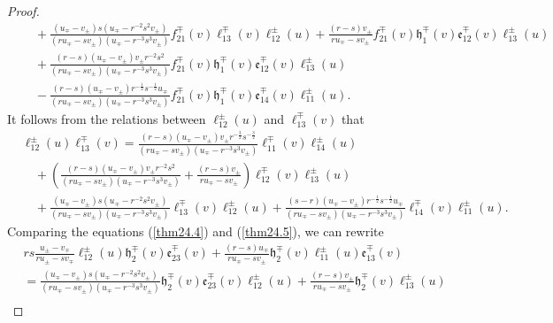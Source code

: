 \documentclass[10pt,a4paper]{amsart}
\numberwithin{equation}{section}
\begin{document}
\begin{proof}
\begin{equation}
\begin{aligned}
&\quad+\frac{\left(u_{\mp}-v_{ \pm}\right) s\left(u_{\mp}-r^{-2} s^2 v_{ \pm}\right)}{\left(r u_{\mp}-s v_{ \pm}\right)\left(u_{\mp}-r^{-3} s^3 v_{ \pm}\right)} f_{21}^{\mp}(v) \ell_{13}^{\mp}(v) \ell_{12}^{ \pm}(u)+\frac{(r-s) v_{ \pm}}{r u_{\mp}-s v_{ \pm}} f_{21}^{\mp}(v) \mathfrak{h}_1^{\mp}(v) \mathfrak{e}_{12}^{\mp}(v) \ell_{13}^{ \pm}(u)\\
&\quad +\frac{(r-s)\left(u_{\mp}-v_{ \pm}\right) v_{ \pm} r^{-2} s^2}{\left(r u_{\mp}-s v_{ \pm}\right)\left(u_{\mp}-r^{-3} s^3 v_{ \pm}\right)} f_{21}^{\mp}(v) \mathfrak{h}_1^{\mp}(v) \mathfrak{e}_{12}^{\mp}(v) \ell_{13}^{ \pm}(u)\\
&\quad -\frac{(r-s)\left(u_{\mp}-v_{ \pm}\right) r^{-\frac{1}{2}} s^{-\frac{1}{2}} u_{\mp}}{\left(r u_{\mp}-s v_{ \pm}\right)\left(u_{\mp}-r^{-3} s^3 v_{ \pm}\right)}  f_{21}^{\mp}(v) \mathfrak{h}_1^{\mp}(v) \mathfrak{e}_{14}^{\mp}(v) \ell_{11}^{ \pm}(u).
\end{aligned}
\end{equation}
It follows from the relations between $\ell_{12}^{ \pm}(u)$ and $\ell_{13}^{\mp}(v)$ that
\begin{align*}
&\ell_{12}^{ \pm}(u) \ell_{13}^{\mp}(v)=\frac{(r-s)\left(u_{\mp}-v_{ \pm}\right) v_{ \pm} r^{-\frac{3}{2}} s^{-\frac{3}{2}}}{\left(r u_{\mp}-s v_{ \pm}\right)\left(u_{\mp}-r^{-3} s^3 v_{ \pm}\right)} \ell_{11}^{\mp}(v) \ell_{14}^{ \pm}(u)\\
&\quad +\left(\frac{(r-s)\left(u_{\mp}-v_{ \pm}\right) v_{ \pm} r^{-2} s^2}{\left(r u_{\mp}-s v_{ \pm}\right)\left(u_{\mp}-r^{-3} s^3 v_{ \pm}\right)}+\frac{(r-s) v_{ \pm}}{r u_{\mp}-s v_{ \pm}}\right) \ell_{12}^{\mp}(v) \ell_{13}^{ \pm}(u)\\
&\quad+\frac{\left(u_{\mp}-v_{ \pm}\right) s\left(u_{\mp}-r^{-2} s^2 v_{ \pm}\right)}{\left(r u_{\mp}-s v_{ \pm}\right)\left(u_{\mp}-r^{-3} s^3 v_{ \pm}\right)} \ell_{13}^{\mp}(v) \ell_{12}^{ \pm}(u)+\frac{(s-r)\left(u_{\mp}-v_{ \pm}\right) r^{-\frac{1}{2}} s^{-\frac{1}{2}} u_{\mp}}{\left(r u_{\mp}-s v_{ \pm}\right)\left(u_{\mp}-r^{-3} s^3 v_{ \pm}\right)} \ell_{14}^{\mp}(v) \ell_{11}^{ \pm}(u).
\end{align*}
Comparing the equations (\ref{thm24.4}) and (\ref{thm24.5}), we can rewrite
\begin{align*}
&r s \frac{u_{ \pm}-v_{\mp}}{r u_{ \pm}-s v_{\mp}} \ell_{12}^{ \pm}(u) \mathfrak{h}_2^{\mp}(v) \mathfrak{e}_{23}^{\mp}(v)+\frac{(r-s) u_{\mp}}{r u_{\mp}-s v_{ \pm}} \mathfrak{h}_2^{\mp}(v) \ell_{11}^{ \pm}(u) \mathfrak{e}_{13}^{\mp}(v)\\
&=\frac{\left(u_{\mp}-v_{ \pm}\right) s\left(u_{\mp}-r^{-2} s^2 v_{ \pm}\right)}{\left(r u_{\mp}-s v_{ \pm}\right)\left(u_{\mp}-r^{-3} s^3 v_{ \pm}\right)} \mathfrak{h}_2^{\mp}(v) \mathfrak{e}_{23}^{\mp}(v) \ell_{12}^{ \pm}(u)+\frac{(r-s) v_{ \pm}}{r u_{\mp}-s v_{ \pm}} \mathfrak{h}_2^{\mp}(v) \ell_{13}^{ \pm}(u)\\

\end{align*}
\end{proof}
\end{document}

